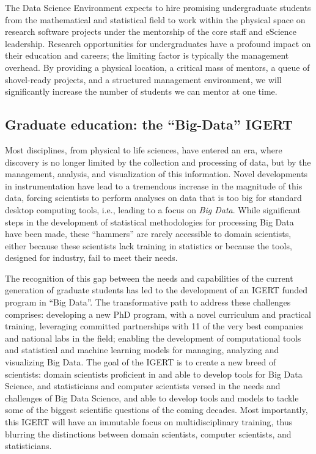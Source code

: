 The Data Science Environment expects to hire promising undergraduate students from the mathematical and statistical field to work within the physical space on research software projects under the mentorship of the core staff and eScience leadership.  Research opportunities for undergraduates have a profound impact on their education and careers; the limiting factor is typically the management overhead.  By providing a physical location, a critical mass of mentors, a queue of shovel-ready projects, and a structured management environment, we will significantly increase the number of students we can mentor at one time.

\subsection{Graduate education: the ``Big-Data'' IGERT}

Most disciplines, from physical to life sciences, have entered an era, where discovery is no longer limited by the collection and processing of data, but by the management, analysis, and visualization of this information. Novel developments in instrumentation have lead to a tremendous increase in the magnitude of this data, forcing scientists to perform analyses on data that is too big for standard desktop computing tools, i.e., leading to a focus on \emph{Big Data}.   While significant steps in the development of statistical methodologies for processing Big Data have been made, these ``hammers'' are rarely accessible to domain scientists, either because these scientists lack training in statistics or because the tools, designed for industry, fail to meet their needs.

The recognition of this gap between the needs and capabilities of the current generation of graduate students has led to the development of an IGERT funded program in ``Big Data''.
The transformative path to address these challenges comprises: developing a new PhD program, with a novel curriculum and practical training, leveraging committed partnerships with 11 of the very best companies and national labs in the field; enabling the development of computational tools and statistical and machine learning models for managing, analyzing and visualizing Big Data.  The goal of the IGERT is to create a new breed of scientists: domain scientists proficient in and able to develop tools for Big Data Science, and statisticians and computer scientists versed in the needs and challenges of Big Data Science, and able to develop tools and models to tackle some of the biggest scientific questions of the coming decades.  Most importantly, this IGERT will have an immutable focus on multidisciplinary training, thus blurring the distinctions between domain scientists, computer scientists, and statisticians.

